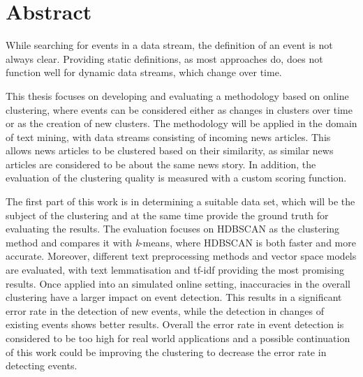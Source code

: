 
\section*{Abstract}


While searching for events in a data stream, the definition of an event is not always clear. Providing static definitions, as most approaches do,
does not function well for dynamic data streams, which change over time.


This thesis focuses on developing and evaluating a methodology based on online clustering, where events can be considered either as changes in clusters over time or as the creation of new clusters. The methodology will be applied in the domain of text mining, with data streams consisting of incoming news articles. This allows news articles to be clustered based on their similarity, as similar news articles are considered to be about the same news story. In addition, the evaluation of the clustering quality is measured with a custom scoring function.

The first part of this work is in determining a suitable data set, which will be the subject of the clustering and at the same time provide the ground truth for evaluating the results. The evaluation focuses on HDBSCAN as the clustering method and compares it with \textit{k}-means, where HDBSCAN is both faster and more accurate. Moreover, different text preprocessing methods and vector space models are evaluated, with text lemmatisation and tf-idf providing the most promising results. Once applied into an simulated online setting, inaccuracies in the overall clustering have a larger impact on event detection. This results in a significant error rate in the detection of new events, while the detection in changes of existing events shows better results. Overall the error rate in event detection is considered to be too high for real world applications and a possible continuation of this work could be improving the clustering to decrease the error rate in detecting events.


